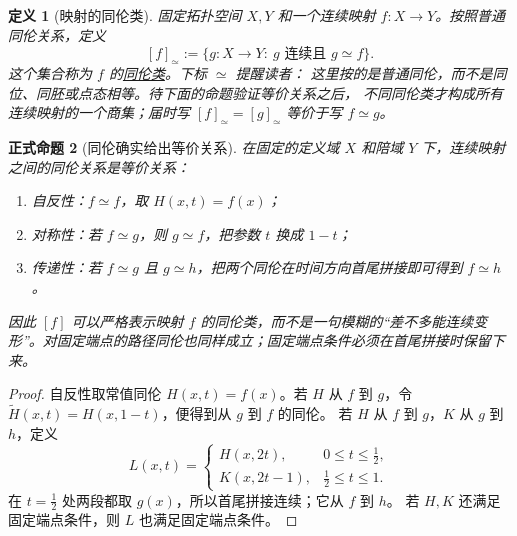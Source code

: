 \documentclass[UTF8,fontset=none,a4paper,11pt]{ctexart}
\theoremstyle{foundation-definition}
\newtheorem{definition}{定义}[section]
\theoremstyle{foundation-theorem}
\theoremstyle{foundation-proposition}
\newtheorem{proposition}[definition]{正式命题}
\theoremstyle{foundation-example}
\theoremstyle{foundation-remark}
\theoremstyle{foundation-theorem}
\newcommand{\term}[2]{\hyperref[#1]{#2}}
\begin{document}
\begin{definition}[映射的同伦类]\label{def:homotopy-class}
固定拓扑空间 \(X,Y\) 和一个连续映射 \(f:X\to Y\)。按照普通同伦关系，定义
\[
[f]_{\simeq}:=\{g:X\to Y:\ g\text{ 连续且 }g\simeq f\}.
\]
这个集合称为 \(f\) 的\term{def:homotopy-class}{同伦类}。下标 \(\simeq\) 提醒读者：
这里按的是普通同伦，而不是同位、同胚或点态相等。待下面的命题验证等价关系之后，
不同同伦类才构成所有连续映射的一个商集；届时写 \([f]_{\simeq}=[g]_{\simeq}\)
等价于写 \(f\simeq g\)。
\end{definition}

\begin{proposition}[同伦确实给出等价关系]
在固定的定义域 \(X\) 和陪域 \(Y\) 下，连续映射之间的同伦关系是等价关系：
\begin{enumerate}[label=(\roman*)]
  \item 自反性：\(f\simeq f\)，取 \(H(x,t)=f(x)\)；
  \item 对称性：若 \(f\simeq g\)，则 \(g\simeq f\)，把参数 \(t\) 换成 \(1-t\)；
\item 传递性：若 \(f\simeq g\) 且 \(g\simeq h\)，把两个同伦在时间方向首尾拼接即可得到 \(f\simeq h\)。
\end{enumerate}
因此 \([f]\) 可以严格表示映射 \(f\) 的同伦类，而不是一句模糊的“差不多能连续变形”。对固定端点的路径同伦也同样成立；固定端点条件必须在首尾拼接时保留下来。
\end{proposition}

\begin{proof}
自反性取常值同伦 \(H(x,t)=f(x)\)。若 \(H\) 从 \(f\) 到 \(g\)，令
\(\widetilde H(x,t)=H(x,1-t)\)，便得到从 \(g\) 到 \(f\) 的同伦。
若 \(H\) 从 \(f\) 到 \(g\)，\(K\) 从 \(g\) 到 \(h\)，定义
\[
L(x,t)=
\begin{cases}
H(x,2t),&0\leq t\leq\tfrac12,\\
K(x,2t-1),&\tfrac12\leq t\leq1.
\end{cases}
\]
在 \(t=\tfrac12\) 处两段都取 \(g(x)\)，所以首尾拼接连续；它从 \(f\) 到 \(h\)。
若 \(H,K\) 还满足固定端点条件，则 \(L\) 也满足固定端点条件。
\end{proof}
\end{document}
